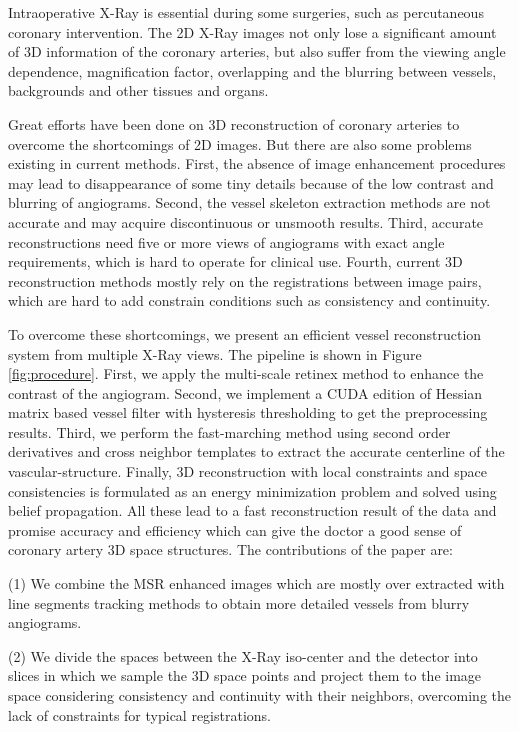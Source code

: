 Intraoperative X-Ray is essential during some surgeries, such as
percutaneous coronary intervention. The 2D X-Ray images not only lose
a significant amount of 3D information of the coronary arteries, but
also suffer from the viewing angle dependence, magnification factor,
overlapping and the blurring between vessels, backgrounds and other
tissues and organs.

Great efforts have been done on 3D reconstruction of coronary arteries
to overcome the shortcomings of 2D images. But there are also some
problems existing in current methods. First, the absence of image
enhancement procedures may lead to disappearance of some tiny details
because of the low contrast and blurring of angiograms. Second, the
vessel skeleton extraction methods are not accurate and may acquire
discontinuous or unsmooth results. Third, accurate reconstructions
need five or more views of angiograms with exact angle requirements,
which is hard to operate for clinical use. Fourth, current 3D
reconstruction methods mostly rely on the registrations between image
pairs, which are hard to add constrain conditions such as consistency
and continuity.

To overcome these shortcomings, we present an efficient vessel
reconstruction system from multiple X-Ray views. The pipeline is shown
in Figure \ref{fig:procedure}. First, we apply the multi-scale retinex
method to enhance the contrast of the angiogram. Second, we implement
a CUDA edition of Hessian matrix based vessel filter with hysteresis
thresholding to get the preprocessing results. Third, we perform the
fast-marching method using second order derivatives and cross neighbor
templates to extract the accurate centerline of the
vascular-structure. Finally, 3D reconstruction with local constraints
and space consistencies is formulated as an energy minimization
problem and solved using belief propagation. All these lead to a fast
reconstruction result of the data and promise accuracy and efficiency
which can give the doctor a good sense of coronary artery 3D space
structures. The contributions of the paper are:

(1) We combine the MSR enhanced images which are mostly over extracted
with line segments tracking methods to obtain more detailed vessels
from blurry angiograms.

(2) We divide the spaces between the X-Ray iso-center and the detector
into slices in which we sample the 3D space points and project them to
the image space considering consistency and continuity with their
neighbors, overcoming the lack of constraints for typical
registrations.

